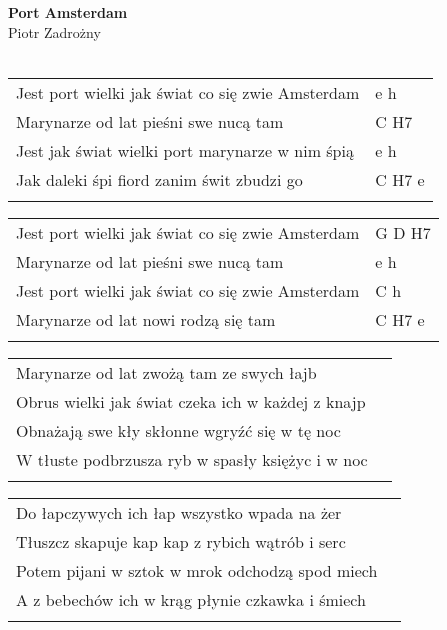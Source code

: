 \documentclass[a5paper]{article}
\begin{document}


\noindent
\fontsize{12pt}{15pt}\selectfont
\textbf{Port Amsterdam} \\
\fontsize{8pt}{10pt}\selectfont
Piotr Zadrożny \\ \\
\fontsize{10pt}{12pt}\selectfont
{}
\begin{tabular}{@{}p{9.00cm}p{3cm}@{}}
\noindent
Jest port wielki jak świat co się zwie Amsterdam & e h \\
Marynarze od lat pieśni swe nucą tam & C H7 \\
Jest jak świat wielki port marynarze w nim śpią & e h \\
Jak daleki śpi fiord zanim świt zbudzi go & C H7 e \\ \\
\end{tabular}

\noindent
\begin{tabular}{@{}p{8.00cm}p{3cm}@{}}
Jest port wielki jak świat co się zwie Amsterdam & G D H7\\
Marynarze od lat pieśni swe nucą tam & e h\\
Jest port wielki jak świat co się zwie Amsterdam & C h\\
Marynarze od lat nowi rodzą się tam & C H7 e \\ \\
\end{tabular}

\noindent
\begin{tabular}{@{}p{8.00cm}p{3cm}@{}}
Marynarze od lat zwożą tam ze swych łajb\\
Obrus wielki jak świat czeka ich w każdej z knajp\\
Obnażają swe kły skłonne wgryźć się w tę noc\\
W tłuste podbrzusza ryb w spasły księżyc i w noc\\\\
\end{tabular}

\noindent
\begin{tabular}{@{}p{8.00cm}p{3cm}@{}}
Do łapczywych ich łap wszystko wpada na żer\\
Tłuszcz skapuje kap kap z rybich wątrób i serc\\
Potem pijani w sztok w mrok odchodzą spod miech\\
A z bebechów ich w krąg płynie czkawka i śmiech\\\\
\end{tabular}
\end{document}
